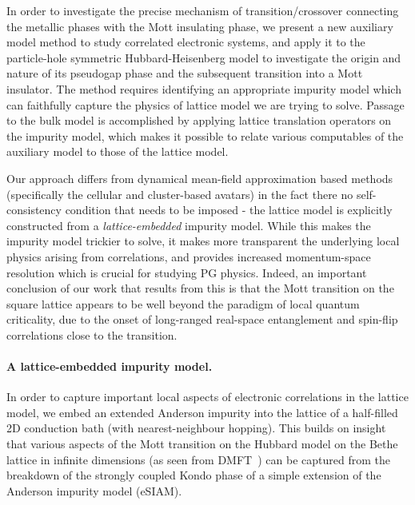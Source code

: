 \documentclass[%
 reprint,
superscriptaddress,
groupedaddress,
 amsmath,amssymb,
 aps,
prl
]{revtex4-2}
\begin{document}
In order to investigate the precise mechanism of transition/crossover connecting the metallic phases with the Mott insulating phase, we present a new auxiliary model method to study correlated electronic systems, and apply it to the particle-hole symmetric Hubbard-Heisenberg model to investigate the origin and nature of its pseudogap phase and the subsequent transition into a Mott insulator. The method requires identifying an appropriate impurity model which can faithfully capture the physics of lattice model we are trying to solve. Passage to the bulk model is accomplished by applying lattice translation operators on the impurity model, which makes it possible to relate various computables of the auxiliary model to those of the lattice model.

Our approach differs from dynamical mean-field approximation based methods (specifically the cellular and cluster-based avatars) in the fact there no self-consistency condition that needs to be imposed - the lattice model is explicitly constructed from a {\it lattice-embedded} impurity model. While this makes the impurity model trickier to solve, it makes more transparent the underlying local physics arising from correlations, and provides increased momentum-space resolution which is crucial for studying PG physics. Indeed, an important conclusion of our work that results from this is that the Mott transition on the square lattice appears to be well beyond the paradigm of local quantum criticality, due to the onset of long-ranged real-space entanglement and spin-flip correlations close to the transition.


\paragraph*{A lattice-embedded impurity model.}
In order to capture important local aspects of electronic correlations in the lattice model,  
we embed an extended Anderson impurity 
into the lattice of a half-filled 2D conduction bath (with nearest-neighbour hopping). This builds on insight 
\cite{Mukherjee_2023} that various aspects of the Mott %
transition on the %
Hubbard model on the Bethe lattice in infinite dimensions (as seen %
from 
DMFT~\cite{georges1996}) can be captured from the breakdown of the strongly coupled Kondo phase of a simple extension of the Anderson impurity model (eSIAM). 
\end{document}
